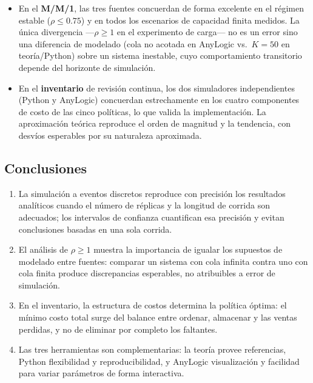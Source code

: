 \documentclass[11pt,a4paper]{article}
\begin{document}
\begin{itemize}
    \item En el \textbf{M/M/1}, las tres fuentes concuerdan de forma
          excelente en el régimen estable ($\rho \leq 0.75$) y en todos los
          escenarios de capacidad finita medidos. La única divergencia
          —$\rho \geq 1$ en el experimento de carga— no es un error sino una
          diferencia de modelado (cola no acotada en AnyLogic vs.\ $K=50$ en
          teoría/Python) sobre un sistema inestable, cuyo comportamiento
          transitorio depende del horizonte de simulación.
    \item En el \textbf{inventario} de revisión continua, los dos
          simuladores independientes (Python y AnyLogic) concuerdan
          estrechamente en los cuatro componentes de costo de las cinco
          políticas, lo que valida la implementación. La aproximación teórica
          reproduce el orden de magnitud y la tendencia, con desvíos
          esperables por su naturaleza aproximada.
\end{itemize}

\subsection{Conclusiones}

\begin{enumerate}
    \item La simulación a eventos discretos reproduce con precisión los
          resultados analíticos cuando el número de réplicas y la longitud
          de corrida son adecuados; los intervalos de confianza cuantifican
          esa precisión y evitan conclusiones basadas en una sola corrida.
    \item El análisis de $\rho \geq 1$ muestra la importancia de igualar los
          supuestos de modelado entre fuentes: comparar un sistema con cola
          infinita contra uno con cola finita produce discrepancias
          esperables, no atribuibles a error de simulación.
    \item En el inventario, la estructura de costos determina la política
          óptima: el mínimo costo total surge del balance entre ordenar,
          almacenar y las ventas perdidas, y no de eliminar por completo los
          faltantes.
    \item Las tres herramientas son complementarias: la teoría provee
          referencias, Python flexibilidad y reproducibilidad, y AnyLogic
          visualización y facilidad para variar parámetros de forma
          interactiva.
\end{enumerate}
\end{document}
